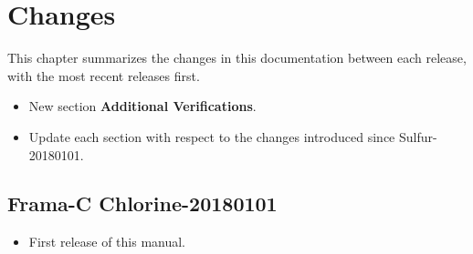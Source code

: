 \chapter{Changes}\label{chap:changes}

This chapter summarizes the changes in this documentation between each \fclang
release, with the most recent releases first.

\begin{itemize}
\item New section \textbf{Additional Verifications}.
\item Update each section with respect to the changes introduced since \eacsl
  Sulfur-20180101.
\end{itemize}

\section*{Frama-C Chlorine-20180101}

\begin{itemize}
\item First release of this manual.
\end{itemize}
